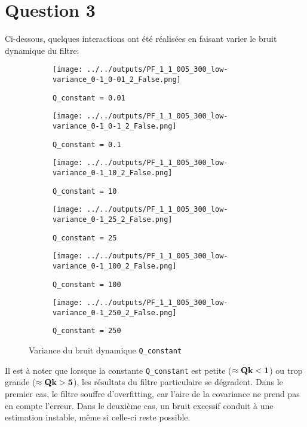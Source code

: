 \documentclass[../CSC_5RO12_TA_TP3.tex]{subfiles}
\begin{document}
\section{Question 3}
\noindent Ci-dessous, quelques interactions ont été réalisées en faisant varier le bruit dynamique du filtre:
\begin{figure}[H]
    \centering
    \begin{subfigure}[b]{0.475\textwidth}
        \centering
        \texttt{[image: ../../outputs/PF\_1\_1\_005\_300\_low-variance\_0-1\_0-01\_2\_False.png]}
        \caption{\texttt{Q\_constant = 0.01}}
        \label{}
    \end{subfigure}\hfill
    \begin{subfigure}[b]{0.475\textwidth}
        \centering
        \texttt{[image: ../../outputs/PF\_1\_1\_005\_300\_low-variance\_0-1\_0-1\_2\_False.png]}
        \caption{\texttt{Q\_constant = 0.1}}
        \label{}
    \end{subfigure}
    \begin{subfigure}[b]{0.475\textwidth}
        \centering
        \texttt{[image: ../../outputs/PF\_1\_1\_005\_300\_low-variance\_0-1\_10\_2\_False.png]}
        \caption{\texttt{Q\_constant = 10}}
        \label{}
    \end{subfigure}\hfill
    \begin{subfigure}[b]{0.475\textwidth}
        \centering
        \texttt{[image: ../../outputs/PF\_1\_1\_005\_300\_low-variance\_0-1\_25\_2\_False.png]}
        \caption{\texttt{Q\_constant = 25}}
        \label{}
    \end{subfigure}
    \begin{subfigure}[b]{0.475\textwidth}
        \centering
        \texttt{[image: ../../outputs/PF\_1\_1\_005\_300\_low-variance\_0-1\_100\_2\_False.png]}
        \caption{\texttt{Q\_constant = 100}}
        \label{}
    \end{subfigure}\hfill
    \begin{subfigure}[b]{0.475\textwidth}
        \centering
        \texttt{[image: ../../outputs/PF\_1\_1\_005\_300\_low-variance\_0-1\_250\_2\_False.png]}
        \caption{\texttt{Q\_constant = 250}}
        \label{}
    \end{subfigure}
    \caption{Variance du bruit dynamique \texttt{Q\_constant}}
    \label{}
\end{figure}
\noindent Il est à noter que lorsque la constante \texttt{Q\_constant} est petite ($\approx \bf{Q}{k} < 1$) ou trop grande ($\approx \bf{Q}{k} > 5$), les résultats du filtre particulaire se dégradent. Dans le premier cas, le filtre souffre d'overfitting, car l'aire de la covariance ne prend pas en compte l'erreur. Dans le deuxième cas, un bruit excessif conduit à une estimation instable, même si celle-ci reste possible.\\
\end{document}
